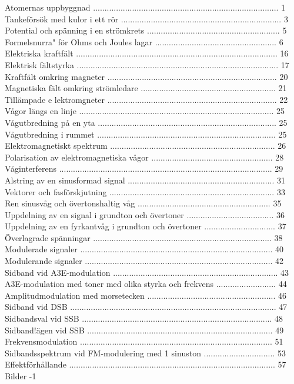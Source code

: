 \documentclass[a4paper,twoside,twocolumn,openright]{book}
\begin{document}
{{{{{{{{{{{Atomernas uppbyggnad ................................................................................. 1
Tankeförsök med kulor i ett rör ...................................................................... 3
Potential och spänning i en strömkrets .......................................................... 5
Formelsnurra" för Ohms och Joules lagar ..................................................... 6
Elektriska kraftfält ........................................................................................ 16
Elektrisk fältstyrka ........................................................................................ 17
Kraftfält omkring magneter .......................................................................... 20
Magnetiska fält omkring strömledare ........................................................... 21
Tillämpade e lektromgneter .......................................................................... 22
Vågor längs en linje ..................................................................................... 25
Vågutbredning på en yta .............................................................................. 25
Vågutbredning i rummet .............................................................................. 25
Elektromagnetiskt spektrum ........................................................................ 26
Polarisation av elektromagnetiska vågor ..................................................... 28
Våginterferens ............................................................................................. 29
Alstring av en sinusformad signal ................................................................ 31
Vektorer och fasförskjutning ........................................................................ 33
Ren sinusvåg och övertonshaltig våg .......................................................... 35
Uppdelning av en signal i grundton och övertoner ...................................... 36
Uppdelning av en fyrkantvåg i grundton och övertoner ............................... 37
Överlagrade spänningar .............................................................................. 38
Modulerade signaler .................................................................................... 40
Modulerande signaler .................................................................................. 42
Sidband vid A3E-modulation ........................................................................ 43
A3E-modulation med toner med olika styrka och frekvens .......................... 44
Amplitudmodulation med morsetecken ........................................................ 46
Sidband vid DSB .......................................................................................... 47
Sidbandsval vid SSB ................................................................................... 48
Sidband!ägen vid SSB ................................................................................. 49
Frekvensmodulation .................................................................................... 51
Sidbandsspektrum vid FM-modulering med 1 sinuston ............................... 53
Effektförhållande .......................................................................................... 57
Bilder -1

}}}}}}}}}}}
\end{document}

